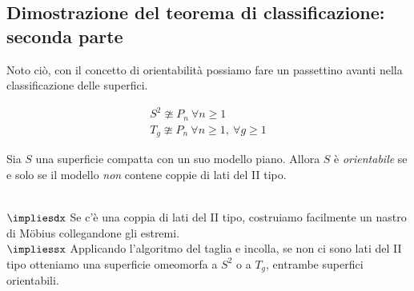\subsection{Dimostrazione del teorema di classificazione: seconda parte}
Noto ciò, con il concetto di orientabilità possiamo fare un passettino avanti nella classificazione delle superfici.
\begin{corollary}
	\begin{gather*}
		S^2 \ncong P_n\ \forall n\geq 1\\
		T_g \ncong P_n\ \forall n\geq 1,\ \forall g\geq 1
	\end{gather*}
\vspace{-6mm}
\end{corollary}
\begin{corollary}
	Sia $S$ una superficie compatta con un suo modello piano. Allora $S$ è \textit{orientabile} se e solo se il modello \textit{non} contene coppie di lati del II tipo.
\end{corollary}
\begin{demonstration}~{}\\
$\impliesdx$ Se c'è una coppia di lati del II tipo, costruiamo facilmente un nastro di Möbius collegandone gli estremi.\\
$\impliessx$ Applicando l'algoritmo del taglia e incolla, se non ci sono lati del II tipo otteniamo una superficie omeomorfa a $S^2$ o a $T_g$, entrambe superfici orientabili.
\end{demonstration}
